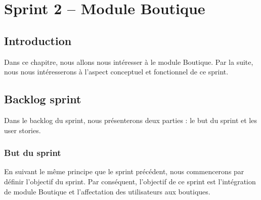 \chapter{Sprint 2 – Module Boutique}
	
\section*{Introduction}
Dans ce chapitre, nous allons nous intéresser à le module Boutique. Par la suite, nous nous intéresserons à l’aspect conceptuel et fonctionnel de ce sprint.

\section[Backlog sprint]{Backlog sprint}
Dans le backlog du sprint, nous présenterons deux parties :  le but du sprint et les user stories.

\subsection[But du sprint]{But du sprint}
En suivant le même principe que le sprint précédent, nous commencerons par définir l'objectif du sprint. Par conséquent, l'objectif de ce sprint est l'intégration de module Boutique et l’affectation des utilisateurs aux boutiques.
